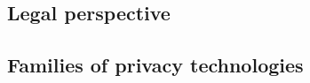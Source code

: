 \documentclass[../overview.tex]{subfiles}
\begin{document}
\subsection{Legal perspective}

\subsection{Families of privacy technologies}
\end{document}

